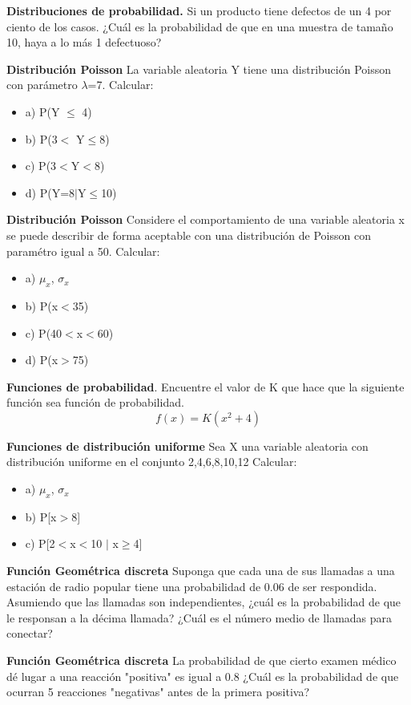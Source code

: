 \documentclass{oxmathproblems}
\begin{document}
\begin{questions}


\miquestion \textbf {Distribuciones de probabilidad.} Si un producto tiene defectos de un 4 por ciento de los casos. ¿Cuál es la probabilidad de que en una muestra de tamaño 10, haya a lo más 1 defectuoso?

\miquestion \textbf {Distribución Poisson} La variable aleatoria Y tiene una distribución Poisson con parámetro $\lambda$=7. 
Calcular: 
\begin{itemize}
\item  a) P(Y $\leq$ 4)
\item  b) P(3$<$ Y$\leq$8)
\item  c) P(3$<$Y$<$8)
\item  d) P(Y=8$\mid$Y$\leq$10)
\end{itemize}

\miquestion \textbf {Distribución Poisson} Considere el comportamiento de una variable aleatoria x se puede describir de forma aceptable con una distribución de Poisson con paramétro igual a 50. 
Calcular: 
\begin{itemize}
\item a) $\mu_x$, $\sigma_x$
\item  b) P(x$<$35)
\item  c) P(40$<$x$<$60)
\item  d) P(x$>$75)
\end{itemize}

\miquestion \textbf{Funciones de probabilidad}.  Encuentre el valor de K que hace que la siguiente función sea función de probabilidad. 
 $$f(x) = K(x^2 + 4)$$

	
\miquestion \textbf{Funciones de distribución uniforme} Sea X una variable aleatoria con distribución uniforme en el conjunto {2,4,6,8,10,12}
Calcular: 
\begin{itemize}
\item  a) $\mu_x$, $\sigma_x$
\item  b) P[x$>$8]
\item  c) P[2$<$x$<$10 $\mid$ x$\geq$4]
\end{itemize}
	
\miquestion \textbf {Función Geométrica discreta} Suponga que cada una de sus llamadas a una estación de radio popular tiene una probabilidad de 0.06 de ser respondida. Asumiendo que las  llamadas son independientes, ¿cuál es la probabilidad de que le responsan a la décima llamada? ¿Cuál es el número medio de llamadas para conectar?

\miquestion \textbf {Función Geométrica discreta} La probabilidad de que cierto examen médico dé lugar a una reacción "positiva" es igual a 0.8 ¿Cuál es la probabilidad de que ocurran 5 reacciones "negativas" antes de la primera positiva?



\end{questions}
\end{document}
